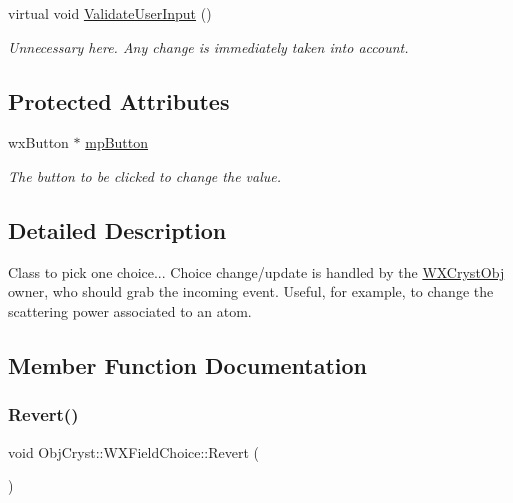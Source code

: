 \begin{DoxyCompactItemize}
\mbox{\label{class_obj_cryst_1_1_w_x_field_choice_add40d26ebf924ce1c42083462b0ebf69}} 
virtual void \mbox{\hyperlink{class_obj_cryst_1_1_w_x_field_choice_add40d26ebf924ce1c42083462b0ebf69}{Validate\+User\+Input}} ()
\begin{DoxyCompactList}\small\item\em Unnecessary here. Any change is immediately taken into account. \end{DoxyCompactList}\end{DoxyCompactItemize}
\subsection*{Protected Attributes}
\begin{DoxyCompactItemize}
\item 
\mbox{\label{class_obj_cryst_1_1_w_x_field_choice_a9b58dd176b85093cdda849d0cb041e5f}} 
wx\+Button $\ast$ \mbox{\hyperlink{class_obj_cryst_1_1_w_x_field_choice_a9b58dd176b85093cdda849d0cb041e5f}{mp\+Button}}
\begin{DoxyCompactList}\small\item\em The button to be clicked to change the value. \end{DoxyCompactList}\end{DoxyCompactItemize}


\subsection{Detailed Description}
Class to pick one choice... Choice change/update is handled by the \mbox{\hyperlink{class_obj_cryst_1_1_w_x_cryst_obj}{W\+X\+Cryst\+Obj}} owner, who should grab the incoming event. Useful, for example, to change the scattering power associated to an atom. 

\subsection{Member Function Documentation}
\mbox{\label{class_obj_cryst_1_1_w_x_field_choice_a3b923575bb9d616bd9c80a7929d0a388}} 
\subsubsection{\texorpdfstring{Revert()}{Revert()}}
{\footnotesize\ttfamily void Obj\+Cryst\+::\+W\+X\+Field\+Choice\+::\+Revert (\begin{DoxyParamCaption}{ }\end{DoxyParamCaption})\hspace{0.3cm}{\ttfamily [virtual]}}

